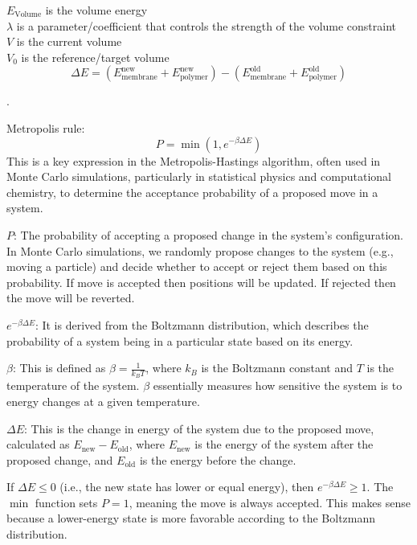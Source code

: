 \documentclass[12pt]{article}
\begin{document}
\begin{flushleft}
$E_{\text{Volume}}$ is the volume energy\\
$\lambda$ is a parameter/coefficient that controls the strength of the volume constraint\\
$V$ is the current volume\\
$V_0$ is the reference/target volume\\



\begin{equation}
\Delta E = (E_{\text{membrane}}^{\text{new}} + E_{\text{polymer}}^{\text{new}}) - (E_{\text{membrane}}^{\text{old}} + E_{\text{polymer}}^{\text{old}})
\end{equation}






.


Metropolis rule:
\begin{equation}
P = \min\left(1, e^{-\beta \Delta E}\right)
\end{equation}
This is a key expression in the Metropolis-Hastings algorithm, often used in Monte Carlo simulations, particularly in statistical physics and computational chemistry, to determine the acceptance probability of a proposed move in a system.


 $P$: The probability of accepting a proposed change in the system's configuration. In Monte Carlo simulations, we randomly propose changes to the system (e.g., moving a particle) and decide whether to accept or reject them based on this probability. If move is accepted then positions will be updated. If rejected then the move will be reverted.

 $e^{-\beta \Delta E}$: It is derived from the Boltzmann distribution, which describes the probability of a system being in a particular state based on its energy.

 $\beta$: This is defined as $\beta = \frac{1}{k_B T}$, where $k_B$ is the Boltzmann constant and $T$ is the temperature of the system. $\beta$ essentially measures how sensitive the system is to energy changes at a given temperature.

 $\Delta E$: This is the change in energy of the system due to the proposed move, calculated as $E_{\text{new}} - E_{\text{old}}$, where $E_{\text{new}}$ is the energy of the system after the proposed change, and $E_{\text{old}}$ is the energy before the change.


If $\Delta E \leq 0$ (i.e., the new state has lower or equal energy), then $e^{-\beta \Delta E} \geq 1$. The $\min$ function sets $P = 1$, meaning the move is always accepted. This makes sense because a lower-energy state is more favorable according to the Boltzmann distribution.


\end{flushleft}
\end{document}
